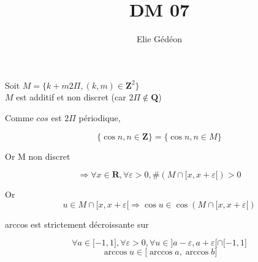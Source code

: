 \documentclass[11pt,a4paper,fleqn]{article}
\author{Elie G\'ed\'eon}
\title{DM 07}
\begin{document}
\maketitle

			Soit $M = \lbrace k + m 2 \Pi , (k, m) \in \mathbf{Z}^2 \rbrace$\\
			$M$ est additif et non discret (car $2 \Pi \notin \mathbf{Q}$)
			
			Comme $cos$ est $2 \Pi$ p\'eriodique,
			
			\[\lbrace \cos n, n \in \mathbf{Z} \rbrace = \lbrace \cos n, n \in M \rbrace\]

			Or M non discret
			
			\[\Rightarrow \forall x \in \mathbf{R} , \forall \varepsilon >0 , \#(M \cap [x,x+\varepsilon[) > 0\]
			
			Or
			\[u \in M \cap [x,x+\varepsilon[ \Rightarrow \cos u \in \cos(M \cap [x,x+\varepsilon[)\]

			arccos est strictement d\'ecroissante sur 
			
			\[\forall a \in \lbrack -1, 1 \rbrack, \forall \varepsilon > 0, \forall u \in \rbrack a - \varepsilon, a + \varepsilon \lbrack \cap \lbrack -1, 1 \rbrack \]
			\[\arccos u  \in  \lbrack \arccos a, \arccos b \rbrack \]
						
\end{document}
